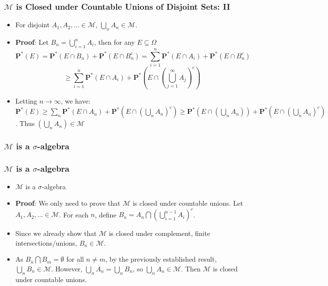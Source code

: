 \documentclass[handout]{beamer}
\newcommand{\BP}{\mathbf{P}}
\begin{document}
\frame
{
  \frametitle{$\mathcal{M}$ is Closed under Countable Unions of Disjoint Sets: II}

   \begin{itemize}

            \item<1->   [] \begin{Lemma}[2.3.13] For disjoint $A_1, A_2,\ldots \in \mathcal{M}$,  $\bigcup_{n} A_n\in \mathcal{M}$.                \end{Lemma}    
       
              \item<2-> []\textbf{Proof}: Let $B_n=\bigcup_{i=1}^n A_i$, then for any $E\subseteq \Omega$
$$ \BP^*( E) =   \BP^*( E\cap B_n)+ \BP^*(E\cap B_n^c)  
             = \sum_{i=1}^n \BP^*( E\cap A_{i})+ \BP^*(E\cap B_n^c)  $$
                $$   \geq \sum_{i=1}^n \BP^*( E\cap A_{i})+ \BP^*(  E\cap (\bigcup_{j=1}^{\infty} A_j) ^c) $$
                   
                   \item<3-> [] Letting $n \to \infty$, we have: 
                     $\BP^*( E) \geq \sum_{n} \BP^*( E\cap A_{n})+ \BP^*(  E\cap (\bigcup_{n} A_n) ^c)   \geq  \BP^*( E\cap (\bigcup_n A_{n}) )+ \BP^*(  E\cap (\bigcup_{n} A_n) ^c)$. Thus $(\bigcup_{n} A_n) \in \mathcal{M}$
   

\end{itemize}
}

\subsubsection{$\mathcal{M}$ is a $\sigma$-algebra}
\frame
{
  \frametitle{$\mathcal{M}$ is a $\sigma$-algebra}

   \begin{itemize}

            \item<1->   [] \begin{Lemma}[2.3.14] $\mathcal{M}$ is a $\sigma$-algebra  \end{Lemma}    
       
              \item<2-> []\textbf{Proof}: We only need to prove that $\mathcal{M}$ is closed under countable unions. Let $A_1, A_2,\ldots \in \mathcal{M}$. For each $n$, define $B_n=A_n\bigcap (\bigcup_{i=1}^{n-1} A_i)^c$.                    
                   \item<3-> [] Since we already show that $\mathcal{M}$ is closed under complement, finite intersections/unions, $B_n\in \mathcal{M}$.
                   \item<4-> [] As $B_n\bigcap B_m=\emptyset$ for all $n\neq m$, by the previously established result, $\bigcup_n B_n \in \mathcal{M}$. However, $\bigcup_n A_n=\bigcup_n B_n$, so $\bigcup_n A_n \in \mathcal{M}$. Then $\mathcal{M}$ is closed under countable unions.
\end{itemize}
}
\end{document}
